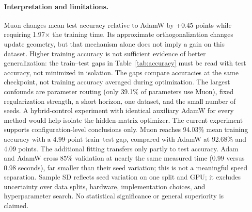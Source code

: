 \paragraph{Interpretation and limitations.}
Muon changes mean test accuracy relative to AdamW by +0.45 points while requiring 1.97$\times$ the training time. Its approximate orthogonalization changes update geometry, but that mechanism alone does not imply a gain on this dataset. Higher training accuracy is not sufficient evidence of better generalization: the train--test gaps in Table~\ref{tab:accuracy} must be read with test accuracy, not minimized in isolation. The gaps compare accuracies at the same checkpoint, not training accuracy averaged during optimization.
The largest confounds are parameter routing (only 39.1\% of parameters use Muon), fixed regularization strength, a short horizon, one dataset, and the small number of seeds. A hybrid-control experiment with identical auxiliary AdamW for every method would help isolate the hidden-matrix optimizer. The current experiment supports configuration-level conclusions only. Muon reaches 94.03\% mean training accuracy with a 4.99-point train--test gap, compared with AdamW at 92.68\% and 4.09 points. The additional fitting transfers only partly to test accuracy. Adam and AdamW cross 85\% validation at nearly the same measured time (0.99 versus 0.98 seconds), far smaller than their seed variation; this is not a meaningful speed separation. Sample SD reflects seed variation on one split and GPU; it excludes uncertainty over data splits, hardware, implementation choices, and hyperparameter search. No statistical significance or general superiority is claimed.
